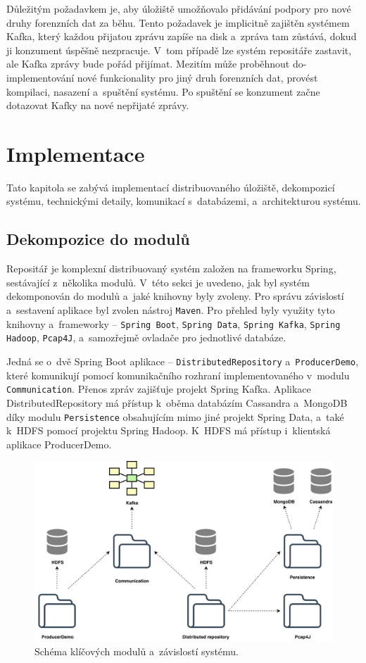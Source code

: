 Důležitým požadavkem je, aby úložiště umožňovalo přidávání podpory pro nové druhy forenzních dat za běhu. Tento požadavek je implicitně zajištěn systémem Kafka, který každou přijatou zprávu zapíše na disk a~zpráva tam zůstává, dokud ji konzument úspěšně nezpracuje. V~tom případě lze systém repositáře zastavit, ale Kafka zprávy bude pořád přijímat. Mezitím může proběhnout do-implementování nové funkcionality pro jiný druh forenzních dat, provést kompilaci, nasazení a~spuštění systému. Po spuštění se konzument začne dotazovat Kafky na nové nepřijaté zprávy.

\chapter{Implementace} \label{chapter_impl}
Tato kapitola se zabývá implementací distribuovaného úložiště, dekompozicí systému, technickými detaily, komunikací s~databázemi, a~architekturou systému.

\section{Dekompozice do modulů}
Repositář je komplexní distribuovaný systém založen na frameworku Spring, sestávající z~několika modulů. V~této sekci je uvedeno, jak byl systém dekomponován do modulů a~jaké knihovny byly zvoleny. Pro správu závislostí a~sestavení aplikace byl zvolen nástroj \texttt{Maven}. Pro přehled byly využity tyto knihovny a~frameworky -- \texttt{Spring Boot}, \texttt{Spring Data}, \texttt{Spring Kafka}, \texttt{Spring Hadoop}, \texttt{Pcap4J}, a~samozřejmě ovladače pro jednotlivé databáze.

Jedná se o~dvě Spring Boot aplikace -- \texttt{DistributedRepository} a~\texttt{ProducerDemo}, které komunikují pomocí komunikačního rozhraní implementovaného v~modulu \texttt{Communication}. Přenos zpráv zajišťuje projekt Spring Kafka. Aplikace DistributedRepository má přístup k~oběma databázím Cassandra a~MongoDB díky modulu \texttt{Persistence} obsahujícím mimo jiné projekt Spring Data, a~také k~HDFS pomocí projektu Spring Hadoop. K~HDFS má přístup i~klientská aplikace ProducerDemo.

\begin{figure}[!h]
  \centering
  \includegraphics[width=12.55cm]{template-fig/Architecture.pdf}
  \caption{Schéma klíčových modulů a~závislostí systému.}
  \label{FIG_Architecture}
\end{figure}

